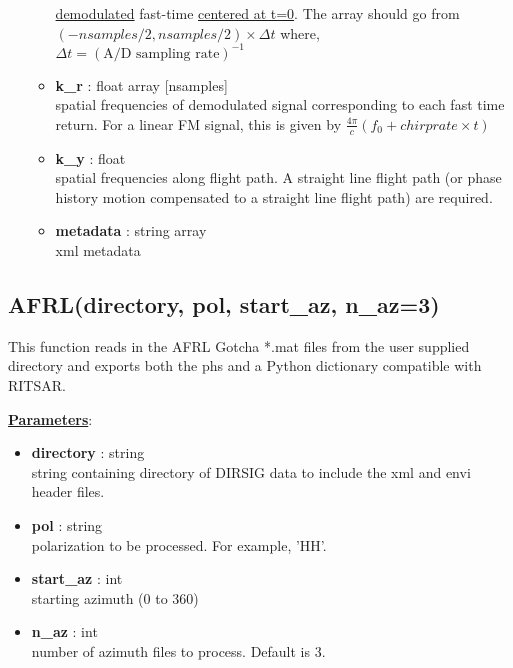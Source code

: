 \documentclass{article}
\newcommand{\defs}[2]{\textbf{{#1}} : {#2}}
\begin{document}
\begin{itemize}
\begin{itemize}
   	    	\underline{demodulated} fast-time \underline{centered at t=0}.  The array should go from $(-nsamples/2, nsamples/2)\times\Delta t$ where, $\Delta t = (\mbox{A/D sampling rate})^{-1}$
   	    \item\defs{k\_r}{float array [nsamples]}\\
   	    	spatial frequencies of demodulated signal corresponding to each fast time return.  For a linear FM signal, this is given by $\frac{4\pi}{c}(f_0+chirprate\times t)$
		\item\defs{k\_y}{float}\\
   	    	spatial frequencies along flight path.  A straight line flight path (or phase history motion compensated to a straight line flight path) are required.
   	    \item\defs{metadata}{string array}\\
   	    	xml metadata
	  \end{itemize}
\end{itemize}


\subsection{AFRL(directory, pol, start\_az, n\_az=3)}
This function reads in the AFRL Gotcha *.mat files from the user supplied directory and exports both the phs and a Python dictionary compatible with RITSAR.

\noindent \underline{\textbf{Parameters}}:
\begin{itemize}
  	\item \defs{directory}{string}\\
  		string containing directory of DIRSIG data to include the xml and envi header files.
  	\item \defs{pol}{string}\\
  		polarization to be processed.  For example, 'HH'.
  	\item \defs{start\_az}{int}\\
  		starting azimuth (0 to 360)
  	\item \defs{n\_az}{int}\\
   		number of azimuth files to process.  Default is 3.
\end{itemize}
\end{document}
